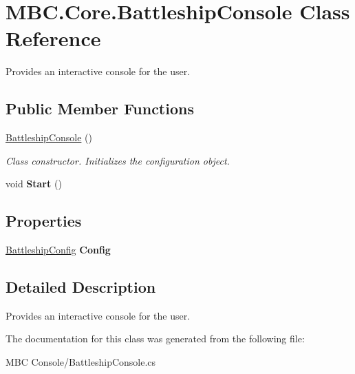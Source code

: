 \hypertarget{class_m_b_c_1_1_core_1_1_battleship_console}{\section{M\-B\-C.\-Core.\-Battleship\-Console Class Reference}
\label{class_m_b_c_1_1_core_1_1_battleship_console}
}


Provides an interactive console for the user. 


\subsection*{Public Member Functions}
\begin{DoxyCompactItemize}
\item 
\hypertarget{class_m_b_c_1_1_core_1_1_battleship_console_add3c148f557e90f9ecbd73a206d66b7e}{\hyperlink{class_m_b_c_1_1_core_1_1_battleship_console_add3c148f557e90f9ecbd73a206d66b7e}{Battleship\-Console} ()}\label{class_m_b_c_1_1_core_1_1_battleship_console_add3c148f557e90f9ecbd73a206d66b7e}

\begin{DoxyCompactList}\small\item\em Class constructor. Initializes the configuration object.\end{DoxyCompactList}\item 
\hypertarget{class_m_b_c_1_1_core_1_1_battleship_console_a3e993a4d4dd65afbf0d2ac88b3f2701f}{void {\bfseries Start} ()}\label{class_m_b_c_1_1_core_1_1_battleship_console_a3e993a4d4dd65afbf0d2ac88b3f2701f}

\end{DoxyCompactItemize}
\subsection*{Properties}
\begin{DoxyCompactItemize}
\item 
\hypertarget{class_m_b_c_1_1_core_1_1_battleship_console_a93b76e042f54d1ca38736636b07e8722}{\hyperlink{class_m_b_c_1_1_core_1_1_battleship_config}{Battleship\-Config} {\bfseries Config}}\label{class_m_b_c_1_1_core_1_1_battleship_console_a93b76e042f54d1ca38736636b07e8722}

\end{DoxyCompactItemize}


\subsection{Detailed Description}
Provides an interactive console for the user.

The documentation for this class was generated from the following file\-:\begin{DoxyCompactItemize}
\item 
M\-B\-C Console/Battleship\-Console.\-cs\end{DoxyCompactItemize}
